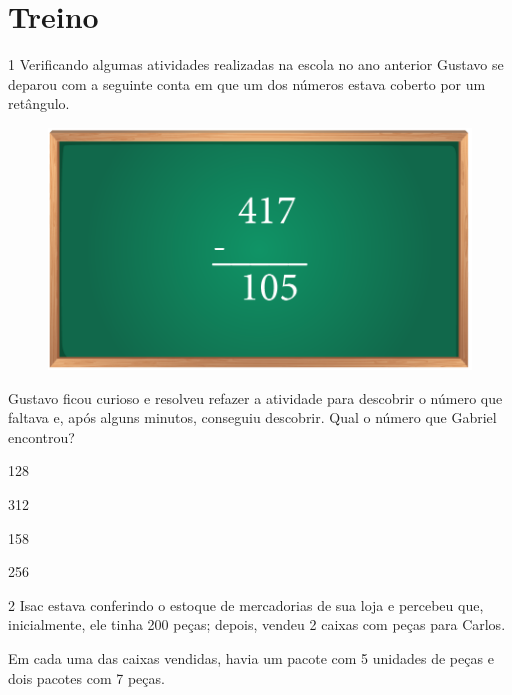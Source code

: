 \begin{mdframed}[linewidth=2pt,linecolor=salmao]
\mbox{}\vspace*{5cm}
\end{mdframed}

\pagebreak

\section*{Treino}

\num{1} Verificando algumas atividades realizadas na escola no ano anterior
Gustavo se deparou com a seguinte conta em que um dos números estava
coberto por um retângulo.

\begin{figure}[htpb!]
\centering
\includegraphics[width=\textwidth]{../ilustracoes/MAT5/SAEB_5ANO_MAT_figura22.png}
\end{figure}

Gustavo ficou curioso e resolveu refazer a atividade para descobrir o
número que faltava e, após alguns minutos, conseguiu descobrir. Qual o número que Gabriel encontrou?

\begin{escolha}
\item
  128
\item
  312
\item
  158
\item
  256
\end{escolha}


\num{2} Isac estava conferindo o estoque de mercadorias de sua loja e
percebeu que, inicialmente, ele tinha 200 peças; depois, vendeu 2 caixas com peças para Carlos.

Em cada uma das caixas vendidas, havia um pacote com 5 unidades de peças e dois
pacotes com 7 peças.

